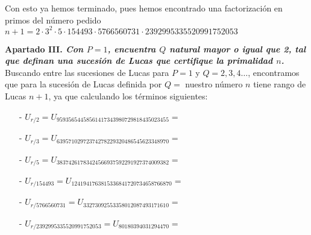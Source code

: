 \documentclass[fleqn]{article}
\begin{document}
    Con esto ya hemos terminado, pues hemos encontrado una factorización en primos del número pedido 
    $n+1 = 2 \cdot 3^2 \cdot 5 \cdot 154493 \cdot 5766560731 \cdot 2392995335520991752053$

    




    \newpage
    \textbf{Apartado III. \textit{Con $P=1$, encuentra $Q$ natural mayor o igual que 2, tal que definan una sucesión de
            Lucas que certifique la primalidad $n$.}} \\
    Buscando entre las sucesiones de Lucas para $P = 1$ y $Q = 2,3,4\dots$, encontramos que para la sucesión de Lucas definida por 
    $Q = $ nuestro número $n$ tiene rango de Lucas $n+1$, ya que calculando los términos siguientes:

    \begin{enumerate}
        \item[-] $U_{r/2} = U_ {95935654458561417343980729818435023455} = $
        \item[-] $U_{r/3} = U_ {63957102972374278229320486545623348970} = $
        \item[-] $U_{r/5} = U_ {38374261783424566937592291927374009382} = $
        \item[-] $U_{r/154493} = U_ {1241941763815336841720734658766870} = $
        \item[-] $U_{r/5766560731} = U_ {33273092553358012087493171610} = $
        \item[-] $U_{r/2392995335520991752053} = U_ {80180394031294470} = $
    \end{enumerate}
\end{document}
